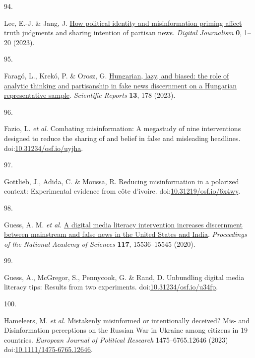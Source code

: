 \documentclass[
  man]{apa6}
\newlength{\cslhangindent}
\newlength{\csllabelwidth}
\newenvironment{CSLReferences}[2] %
 {\begin{list}{}{%
  \setlength{\itemindent}{0pt}
  \setlength{\leftmargin}{0pt}
  \setlength{\parsep}{0pt}
  \ifodd #1
   \setlength{\leftmargin}{\cslhangindent}
   \setlength{\itemindent}{-1\cslhangindent}
  \fi
  \setlength{\itemsep}{#2\baselineskip}}}
 {\end{list}}
\newcommand{\CSLLeftMargin}[1]{\parbox[t]{\csllabelwidth}{\strut#1\strut}}
\newcommand{\CSLRightInline}[1]{\parbox[t]{\linewidth - \csllabelwidth}{\strut#1\strut}}
\begin{document}
\begin{CSLReferences}{0}{0}
\CSLLeftMargin{94. }%
\CSLRightInline{*Lee, E.-J. \& Jang, J. \href{https://doi.org/10.1080/21670811.2022.2163413}{How political identity and misinformation priming affect truth judgments and sharing intention of partisan news}. \emph{Digital Journalism} \textbf{0}, 1--20 (2023).}

\CSLLeftMargin{95. }%
\CSLRightInline{*Faragó, L., Krekó, P. \& Orosz, G. \href{https://doi.org/10.1038/s41598-022-26724-8}{Hungarian, lazy, and biased: the role of analytic thinking and partisanship in fake news discernment on a Hungarian representative sample}. \emph{Scientific Reports} \textbf{13}, 178 (2023).}

\CSLLeftMargin{96. }%
\CSLRightInline{*Fazio, L. \emph{et al.} Combating misinformation: A megastudy of nine interventions designed to reduce the sharing of and belief in false and misleading headlines. doi:\href{https://doi.org/10.31234/osf.io/uyjha}{10.31234/osf.io/uyjha}.}

\CSLLeftMargin{97. }%
\CSLRightInline{*Gottlieb, J., Adida, C. \& Moussa, R. Reducing misinformation in a polarized context: Experimental evidence from côte d{'}ivoire. doi:\href{https://doi.org/10.31219/osf.io/6x4wy}{10.31219/osf.io/6x4wy}.}

\CSLLeftMargin{98. }%
\CSLRightInline{*Guess, A. M. \emph{et al.} \href{https://doi.org/10.1073/pnas.1920498117}{A digital media literacy intervention increases discernment between mainstream and false news in the United States and India}. \emph{Proceedings of the National Academy of Sciences} \textbf{117}, 15536--15545 (2020).}

\CSLLeftMargin{99. }%
\CSLRightInline{*Guess, A., McGregor, S., Pennycook, G. \& Rand, D. Unbundling digital media literacy tips: Results from two experiments. doi:\href{https://doi.org/10.31234/osf.io/u34fp}{10.31234/osf.io/u34fp}.}

\CSLLeftMargin{100. }%
\CSLRightInline{*Hameleers, M. \emph{et al.} Mistakenly misinformed or intentionally deceived? Mis{-} and Disinformation perceptions on the Russian War in Ukraine among citizens in 19 countries. \emph{European Journal of Political Research} 1475--6765.12646 (2023) doi:\href{https://doi.org/10.1111/1475-6765.12646}{10.1111/1475-6765.12646}.}


\end{CSLReferences}
\end{document}
